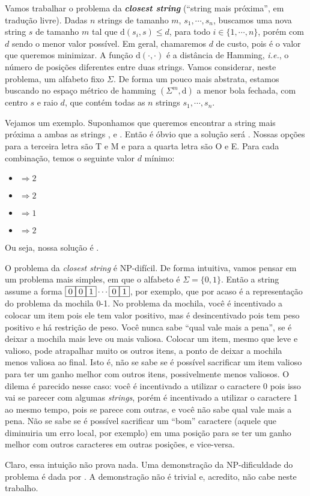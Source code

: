 Vamos trabalhar o problema da \textbf{\textit{closest string}} (``string mais próxima'', em tradução livre). Dadas $n$ strings de tamanho $m$, $s_1, \cdots, s_n$, buscamos uma nova string $s$ de tamanho $m$ tal que $\text{d}(s_i, s) \le d$, para todo $i \in \{1, \cdots, n\}$, porém com $d$ sendo o menor valor possível. Em geral, chamaremos $d$ de custo, pois é o valor que queremos minimizar. A função $\text{d}(\cdot, \cdot)$ é a distância de Hamming, \textit{i.e.}, o número de posições diferentes entre duas strings. Vamos considerar, neste problema, um alfabeto fixo $\Sigma$.
De forma um pouco mais abstrata, estamos buscando no espaço métrico de hamming $\left(\Sigma^m, \text{d}\right)$ a menor bola fechada, com centro $s$ e raio $d$, que contém todas as $n$ strings $s_1, \cdots, s_n$.

Vejamos um exemplo. Suponhamos que queremos encontrar a string mais próxima a ambas as strings ,  e . Então é óbvio que a solução será . Nossas opções para a terceira letra são T e M e para a quarta letra são O e E. Para cada combinação, temos o seguinte valor $d$ mínimo:
\begin{itemize}
    \item {} $\Rightarrow 2$
    \item {} $\Rightarrow 2$
    \item {} $\Rightarrow 1$
    \item {} $\Rightarrow 2$
\end{itemize}
Ou seja, nossa solução é .

O problema da \textit{closest string} é NP-difícil.
De forma intuitiva, vamos pensar em um problema mais simples, em que o alfabeto é $\Sigma = \{0, 1\}$. Então a string assume a forma $\textsc{\fbox{0}}\textsc{\fbox{0}}\textsc{\fbox{1}} \cdots \textsc{\fbox{0}}\textsc{\fbox{1}}$, por exemplo, que por acaso é a representação do problema da mochila 0-1. No problema da mochila, você é incentivado a colocar um item pois ele tem valor positivo, mas é desincentivado pois tem peso positivo e há restrição de peso. Você nunca sabe ``qual vale mais a pena'', se é deixar a mochila mais leve ou mais valiosa. Colocar um item, mesmo que leve e valioso, pode atrapalhar muito os outros itens, a ponto de deixar a mochila menos valiosa ao final. Isto é, não se sabe se é possível sacrificar um item valioso para ter um ganho melhor com outros itens, possivelmente menos valiosos. O dilema é parecido nesse caso: você é incentivado a utilizar o caractere 0 pois isso vai se parecer com algumas \textit{strings}, porém é incentivado a utilizar o caractere 1 ao mesmo tempo, pois se parece com outras, e você não sabe qual vale mais a pena. Não se sabe se é possível sacrificar um ``bom'' caractere (aquele que diminuiria um erro local, por exemplo) em uma posição para se ter um ganho melhor com outros caracteres em outras posições, e vice-versa.

Claro, essa intuição não prova nada. Uma demonstração da NP-dificuldade do problema é dada por \cite{frances1997covering}. A demonstração não é trivial e, acredito, não cabe neste trabalho.